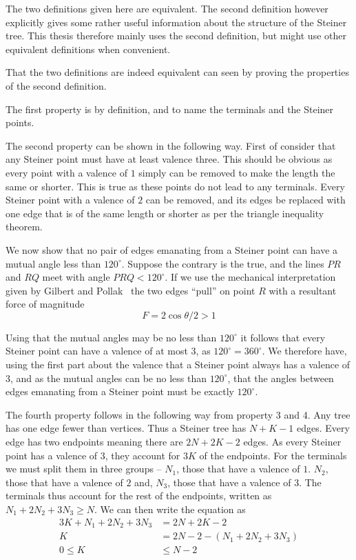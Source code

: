 The two definitions given here are equivalent.  The second definition however explicitly
gives some rather useful information about the structure of the Steiner
tree.  This thesis therefore mainly uses the second definition, but might
use other equivalent definitions when convenient.

That the two definitions are indeed equivalent can seen by proving the
properties of the second definition.

The first property is by definition, and to name the terminals and the
Steiner points.

The second property can be shown in the following way.  First of consider that
any Steiner point must have at least valence three.  This should be obvious as
every point with a valence of $1$ simply can be removed to make the length the
same or shorter. This is true as these points do not lead to any terminals.
Every Steiner point with a valence of $2$ can be removed, and its edges be replaced
with one edge that is of the same length or shorter as per the triangle
inequality theorem.

We now show that no pair of edges emanating from a Steiner point can have a
mutual angle less than $120^{\circ}$.  Suppose the contrary is the true, and the
lines $PR$ and $RQ$ meet with angle $PRQ < 120^{\circ}$.  If we use the
mechanical interpretation given by Gilbert and Pollak~\cite{Gilbert1968} the two
edges ``pull'' on point $R$ with a resultant force of magnitude
%
\begin{equation}
F = 2 \cos \theta / 2 > 1
\end{equation}
%

Using that the mutual angles may be no less than $120^{\circ}$ it follows that
every Steiner point can have a valence of at most $3$, as
$120^{\circ} = 360^{\circ}$.  We therefore have, using the first part about the
valence that a Steiner point always has a valence of $3$, and as the mutual angles
can be no less than $120^{\circ}$, that the angles between edges emanating from
a Steiner point must be exactly $120^{\circ}$.


The fourth property follows in the following way from property 3 and 4.  Any
tree has one edge fewer than vertices.  Thus a Steiner tree has $N+K-1$ edges.
Every edge has two endpoints meaning there are $2N+2K-2$ edges.  As every
Steiner point has a valence of $3$, they account for $3K$ of the endpoints.  For
the terminals we must split them in three groups -- $N_1$, those that have a
valence of $1$.  $N_2$, those that have a valence of $2$ and, $N_3$, those that
have a valence of $3$.  The terminals thus account for the rest of the
endpoints, written as $N_1 + 2 N_2 + 3 N_3 \ge N$.  We can then write the
equation as
%
\begin{align}
  3K + N_1 + 2N_2 + 3N_3 &= 2N + 2K - 2 \\
  K &= 2N - 2 - (N_1 + 2N_2 + 3N_3) \\
  0 \le K &\le N - 2
\end{align}

